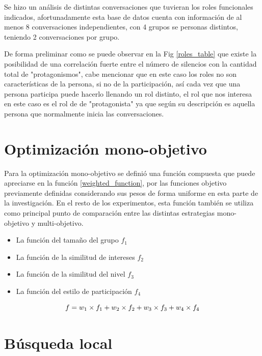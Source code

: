 Se hizo un análisis de distintas conversaciones que tuvieran los roles funcionales indicados, afortunadamente esta base de datos cuenta con información de al menos 8 conversaciones independientes, con 4 grupos se personas distintos, teniendo 2 conversaciones por grupo. 

De forma preliminar como se puede observar en la Fig \ref{roles_table} que existe la posibilidad de una correlación fuerte entre el número de silencios con la cantidad total de "protagonismos", cabe mencionar que en este caso los roles no son características de la persona, si no de la participación, así cada vez que una persona participa puede hacerlo llenando un rol distinto, el rol que nos interesa en este caso es el rol de de "protagonista" ya que según su descripción es aquella persona que normalmente inicia las conversaciones. 

\section{Optimización mono-objetivo}

Para la optimización mono-objetivo se definió una función compuesta que puede apreciarse en la función \ref{weighted_function}, por las funciones objetivo previamente definidas considerando sus pesos de forma uniforme en esta parte de la investigación. En el resto de los experimentos, esta función también se utiliza como principal punto de comparación entre las distintas estrategias mono-objetivo y multi-objetivo.
\begin{itemize}
\item La función del tamaño del grupo \(f_{1}\)
\item La función de la similitud de intereses \(f_{2}\)
\item La función de la similitud del nivel \(f_{3}\)
\item La función del estilo de participación \(f_{4}\)
\end{itemize}

\begin{equation} \label{weighted_function}
    f = w_{1} \times f_{1} + \\
    w_{2} \times f_{2} + \\
    w_{3} \times f_{3} + \\
    w_{4} \times f_{4}
\end{equation}

\section{Búsqueda local}

